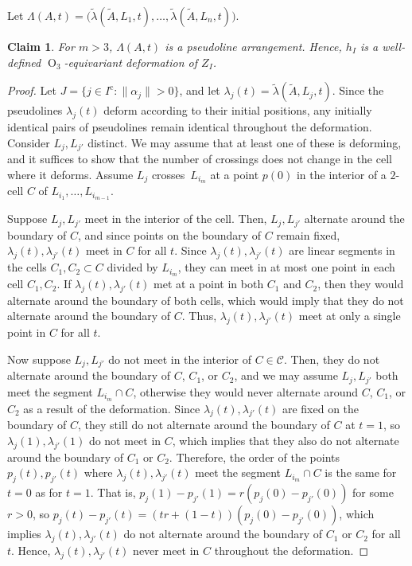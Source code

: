 \documentclass[JEP,XML,SOM,Unicode,NoFloatCountersInSection,published]{cedram}
\newtheorem{claim}[theorem]{Claim}
\theoremstyle{remark}
\let\mc\mathcal
\newcommand{\compl}[1]{{{#1}^{\text{c}}}}
\DeclareMathOperator{\orth}{O}
\begin{document}
Let $\Lambda(A,t) = \bigl(\tilde \lambda(\tilde A,L_1,t),\dots,\tilde \lambda(\tilde A,L_n,t)\bigr)$.

\begin{claim}\label{claim-lambda-arrangement}
For $m>3$, $\Lambda(A,t)$ is a pseudoline arrangement. Hence, $h_I$ is a well-defined $\orth_3$-equivariant deformation of $Z_I$.
\end{claim}

\newcommand{\xj}{{j'}}

\begin{proof}
Let $J = \{ j \in \compl{I}: \|\alpha_j\| > 0 \}$, and let $\lambda_j(t) = \tilde\lambda(\tilde A, L_j,t)$.
Since the pseudolines $\lambda_j(t)$ deform according to their initial positions, any initially identical pairs of pseudolines remain identical throughout the deformation. Consider $L_j,L_\xj$ distinct. We may assume that at least one of these is deforming, and it suffices to show that the number of crossings does not change in the cell where it deforms.
Assume $L_j$ crosses~$L_{i_m}$ at a point $p(0)$ in the interior of a $2$-cell $C$ of $L_{i_1},\dots,L_{i_{m-1}}$.

Suppose $L_j,L_\xj$ meet in the interior of the cell. Then, $L_j,L_\xj$ alternate around the boundary of $C$, and since points on the boundary of $C$ remain fixed, $\lambda_j(t),\lambda_\xj(t)$ meet in $C$ for all $t$. Since $\lambda_j(t),\lambda_\xj(t)$ are linear segments in the cells $C_1,C_2 \subset C$ divided by $L_{i_m}$, they can meet in at most one point in each cell $C_1,C_2$. If $\lambda_j(t),\lambda_\xj(t)$ met at a point in both $C_1$ and $C_2$, then they would alternate around the boundary of both cells, which would imply that they do not alternate around the boundary of $C$.
Thus, $\lambda_j(t),\lambda_\xj(t)$ meet at only a single point in $C$ for all $t$.

Now suppose $L_j,L_\xj$ do not meet in the interior of $C \in \mc{C}$.
Then, they do not alternate around the boundary of $C$, $C_1$, or $C_2$,
and we may assume $L_j,L_\xj$ both meet the segment $L_{i_m} \cap C$, otherwise they would never alternate around $C$, $C_1$, or $C_2$ as a result of the deformation.
Since $\lambda_j(t),\lambda_\xj(t)$ are fixed on the boundary of $C$, they still do not alternate around the boundary of $C$ at $t=1$, so $\lambda_j(1),\lambda_\xj(1)$ do not meet in $C$, which implies that they also do not alternate around the boundary of $C_1$ or $C_2$.
Therefore, the order of the points $p_j(t),p_{\xj}(t)$ where $\lambda_j(t),\lambda_\xj(t)$ meet the segment $L_{i_m} \cap C$ is the same for $t=0$ as for $t=1$.
That is, $p_{j}(1)-p_{\xj}(1)= r (p_{j}(0)-p_{\xj}(0))$ for some $r >0$, so
$p_{j}(t)-p_{\xj}(t)= (tr +(1-t)) (p_{j}(0)-p_{\xj}(0))$, which implies $\lambda_j(t),\lambda_\xj(t)$ do not alternate around the boundary of $C_1$ or $C_2$ for all $t$. Hence, $\lambda_j(t),\lambda_\xj(t)$ never meet in $C$ throughout the deformation.


\end{proof}
\end{document}
